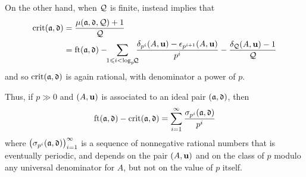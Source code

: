 \documentclass{amsart}
\begin{document}
On the other hand, when $\mathcal{Q}$ is finite,  instead implies that
\begin{align*}
\operatorname{crit}(\mathfrak{a},\mathfrak{d})& = \frac{\mu(\mathfrak{a},\mathfrak{d}, \mathcal{Q}) +1}{\mathcal{Q}} \\
& = \operatorname{ft}(\mathfrak{a}, \mathfrak{d}) -  \!\! \sum_{1 \leqslant i < \log_p\!\! \mathcal{Q}} \!\!\! \frac{\delta_{p^i}(A,\mathbf{u})-\epsilon_{p^{i+1}}(A,\mathbf{u})}{p^i} -  \frac{ \delta_{\mathcal{Q}}(A,\mathbf{u})-1}{\mathcal{Q}}
\end{align*}
and so $\operatorname{crit}(\mathfrak{a},\mathfrak{d})$ is again rational, with denominator a power of $p$.

Thus, if $p \gg 0$ and $(A,\mathbf{u})$ is associated to an ideal pair $(\mathfrak{a}, \mathfrak{d})$, then
\[ \operatorname{ft}(\mathfrak{a}, \mathfrak{d}) - \operatorname{crit}(\mathfrak{a}, \mathfrak{d}) = \sum_{i=1}^{\infty} \frac{ \sigma_{p^i}(\mathfrak{a},\mathfrak{d})}{p^i} \]
where $\big(\sigma_{p^i}(\mathfrak{a},\mathfrak{d}) \big)_{i=1}^{\infty}$ is a sequence of nonnegative rational numbers that is eventually periodic, and depends on the pair $(A,\mathbf{u})$ and on the class of $p$ modulo any universal denominator for $A$, but not on the value of $p$ itself.
\end{document}
